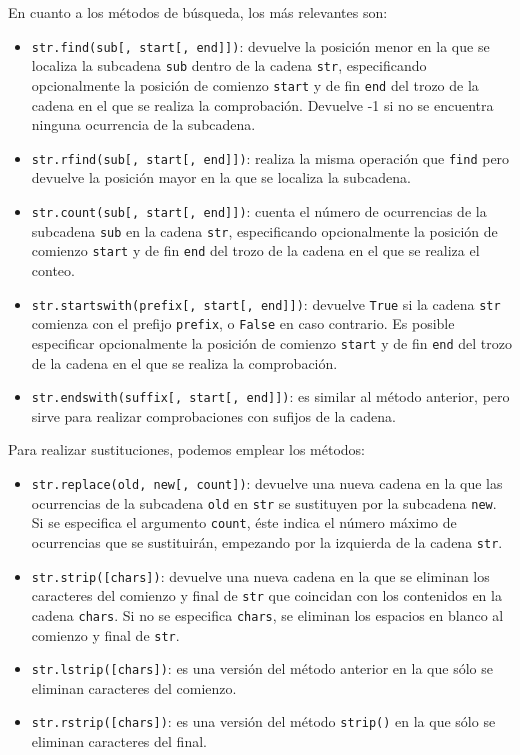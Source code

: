 En cuanto a los métodos de búsqueda, los más relevantes son:
\begin{itemize}
	\item \texttt{str.find(sub[, start[, end]])}: devuelve la posición menor en la que se localiza la subcadena \texttt{sub} dentro de la cadena \texttt{str}, especificando opcionalmente la posición de comienzo \texttt{start} y de fin \texttt{end} del trozo de la cadena en el que se realiza la comprobación. Devuelve -1 si no se encuentra ninguna ocurrencia de la subcadena.
	\item \texttt{str.rfind(sub[, start[, end]])}: realiza la misma operación que \texttt{find} pero devuelve la posición mayor en la que se localiza la subcadena.
	\item \texttt{str.count(sub[, start[, end]])}: cuenta el número de ocurrencias de la subcadena \texttt{sub} en la cadena \texttt{str}, especificando opcionalmente la posición de comienzo \texttt{start} y de fin \texttt{end} del trozo de la cadena en el que se realiza el conteo.
	\item \texttt{str.startswith(prefix[, start[, end]])}: devuelve \texttt{True} si la cadena \texttt{str} comienza con el prefijo \texttt{prefix}, o \texttt{False} en caso contrario. Es posible especificar opcionalmente la posición de comienzo \texttt{start} y de fin \texttt{end} del trozo de la cadena en el que se realiza la comprobación.
	\item \texttt{str.endswith(suffix[, start[, end]])}: es similar al método anterior, pero sirve para realizar comprobaciones con sufijos de la cadena.
\end{itemize}

Para realizar sustituciones, podemos emplear los métodos:
\begin{itemize}
	\item \texttt{str.replace(old, new[, count])}: devuelve una nueva cadena en la que las ocurrencias de la subcadena \texttt{old} en \texttt{str} se sustituyen por la subcadena \texttt{new}. Si se especifica el argumento \texttt{count}, éste indica el número máximo de ocurrencias que se sustituirán, empezando por la izquierda de la cadena \texttt{str}.
	\item \texttt{str.strip([chars])}: devuelve una nueva cadena en la que se eliminan los caracteres del comienzo y final de \texttt{str} que coincidan con los contenidos en la cadena \texttt{chars}. Si no se especifica \texttt{chars}, se eliminan los espacios en blanco al comienzo y final de \texttt{str}.
	\item \texttt{str.lstrip([chars])}: es una versión del método anterior en la que sólo se eliminan caracteres del comienzo.
	\item \texttt{str.rstrip([chars])}: es una versión del método \texttt{strip()} en la que sólo se eliminan caracteres del final.
\end{itemize}

